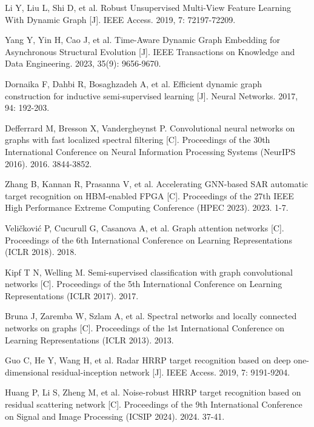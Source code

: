\documentclass[doctor,twoside,ttf]{nudtpaper}
\begin{document}
\begin{thebibliography}{99}
 Li Y, Liu L, Shi D, et al. Robust Unsupervised Multi-View Feature Learning With Dynamic Graph [J]. IEEE Access. 2019, 7: 72197-72209.

 Yang Y, Yin H, Cao J, et al. Time-Aware Dynamic Graph Embedding for Asynchronous Structural Evolution [J]. IEEE Transactions on Knowledge and Data Engineering. 2023, 35(9): 9656-9670.

 Dornaika F, Dahbi R, Bosaghzadeh A, et al. Efficient dynamic graph construction for inductive semi-supervised learning [J]. Neural Networks. 2017, 94: 192-203.

 Defferrard M, Bresson X, Vandergheynst P. Convolutional neural networks on graphs with fast localized spectral filtering [C]. Proceedings of the 30th International Conference on Neural Information Processing Systems (NeurIPS 2016). 2016. 3844-3852.

 Zhang B, Kannan R, Prasanna V, et al. Accelerating GNN-based SAR automatic target recognition on HBM-enabled FPGA [C]. Proceedings of the 27th IEEE High Performance Extreme Computing Conference (HPEC 2023). 2023. 1-7.

 Veličković P, Cucurull G, Casanova A, et al. Graph attention networks [C]. Proceedings of the 6th International Conference on Learning Representations (ICLR 2018). 2018.

 Kipf T N, Welling M. Semi-supervised classification with graph convolutional networks [C]. Proceedings of the 5th International Conference on Learning Representations (ICLR 2017). 2017.

 Bruna J, Zaremba W, Szlam A, et al. Spectral networks and locally connected networks on graphs [C]. Proceedings of the 1st International Conference on Learning Representations (ICLR 2013). 2013.

 Guo C, He Y, Wang H, et al. Radar HRRP target recognition based on deep one-dimensional residual-inception network [J]. IEEE Access. 2019, 7: 9191-9204.

 Huang P, Li S, Zheng M, et al. Noise-robust HRRP target recognition based on residual scattering network [C]. Proceedings of the 9th International Conference on Signal and Image Processing (ICSIP 2024). 2024. 37-41.

\end{thebibliography}

\appendix
\backmatter

\end{document}

